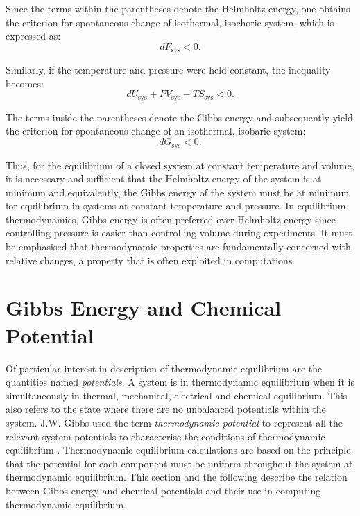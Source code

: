     Since the terms within the parentheses denote the Helmholtz energy, one obtains the criterion for spontaneous change of isothermal, isochoric system, which is expressed as:
    \begin{equation}
        d{F_\text{sys} } < 0.
    \end{equation}

    Similarly, if the temperature and pressure were held constant, the inequality becomes:
    \begin{equation}
        d{U_\text{sys} + PV_\text{sys} - TS_\text{sys} } < 0.
    \end{equation}

    The terms inside the parentheses denote the Gibbs energy and subsequently yield the criterion for spontaneous change of an isothermal, isobaric system:
    \begin{equation}
        d{G_\text{sys} } < 0.
    \end{equation}

    Thus, for the equilibrium of a closed system at constant temperature and volume, it is necessary and sufficient that the Helmholtz energy of the system is at minimum and equivalently, the Gibbs energy of the system must be at minimum for equilibrium in systems at constant temperature and pressure. In equilibrium thermodynamics, Gibbs energy is often preferred over Helmholtz energy since controlling pressure is easier than controlling volume during experiments. It must be emphasised that thermodynamic properties are fundamentally concerned with relative changes, a property that is often exploited in computations.

\section{Gibbs Energy and Chemical Potential}
    Of particular interest in description of  thermodynamic equilibrium are the quantities named \emph{potentials}. A system is in thermodynamic equilibrium when it is simultaneously in thermal, mechanical, electrical and chemical equilibrium. This also refers to the state where there are no unbalanced potentials within the system. J.W. Gibbs used the term \emph{thermodynamic potential} to represent all the relevant system potentials to characterise the conditions of thermodynamic equilibrium \cite{Gibbs:1878aa}. Thermodynamic equilibrium calculations are based on the principle that the potential for each component must be uniform throughout the system at thermodynamic equilibrium. This section and the following describe the relation between Gibbs energy and chemical potentials and their use in computing thermodynamic equilibrium.

